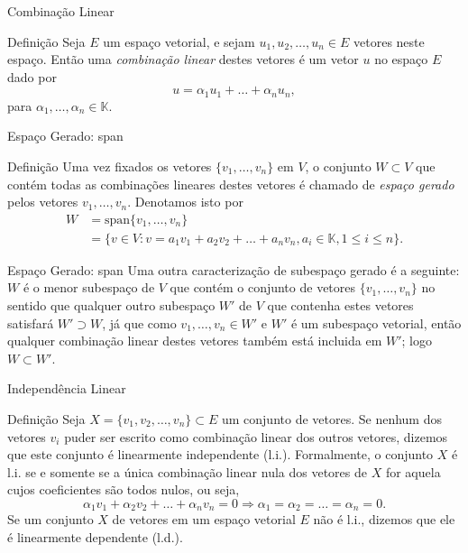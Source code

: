 \documentclass{beamer}
\begin{document}
\begin{darkframes}
\begin{frame}{Combinação Linear}
    \begin{block}{Definição}
      Seja $E$ um espaço vetorial, e sejam $u_1,u_2,\ldots,u_n \in E$ vetores neste espaço. Então uma \emph{combinação linear} destes vetores é um vetor $u$ no espaço $E$ dado por
      \begin{equation*}
        u = \alpha_1 u_1+\ldots+\alpha_n u_n,
      \end{equation*}
      para $\alpha_1,\ldots,\alpha_n \in {\mathbb{K}}$.
    \end{block}
  \end{frame}
  
  \begin{frame}{Espaço Gerado: span}
    \begin{block}{Definição}
      Uma vez fixados os vetores $\{ v_1,\ldots,v_n\}$ em $V$, o conjunto $W\subset V$ que contém todas as combinações lineares destes vetores é chamado de \emph{espaço gerado} pelos vetores $v_1,\ldots,v_n$. Denotamos isto por
      \begin{align*}
        W &= \text{span}\{v_1,\ldots,v_n\}\\
          &= \{ v \in V : v = a_1v_1 + a_2v_2 + \ldots + a_n v_n, a_i\in {\mathbb{K}}, 1\leq i \leq n\}.
      \end{align*}
    \end{block}
  \end{frame}
  
  \begin{frame}{Espaço Gerado: span}
    Uma outra caracterização de subespaço gerado é a seguinte:
    \vfill
    \alert{$W$ é o menor subespaço de $V$ que contém o conjunto de vetores $\{ v_1,\ldots,v_n\}$} no sentido que qualquer outro subespaço $W'$ de $V$ que contenha estes vetores satisfará $W' \supset W$, já que como $v_1,\ldots,v_n \in W'$ e $W'$ é um subespaço vetorial, então qualquer combinação linear destes vetores também está incluida em $W'$; logo $W\subset W'$.
  \end{frame}
  
  \begin{frame}{Independência Linear}
    \begin{block}{Definição}
      Seja $X=\{v_1,v_2,\ldots,v_n\}\subset E$ um conjunto de vetores. Se nenhum dos vetores $v_i$ puder ser escrito como combinação linear dos outros vetores, dizemos que este conjunto é linearmente independente (l.i.). Formalmente, o conjunto $X$ é l.i. se e somente se a única combinação linear nula dos vetores de $X$ for aquela cujos coeficientes são todos nulos, ou seja,
      \begin{equation*}
        \alpha_1v_1+\alpha_2 v_2 + \ldots + \alpha_n v_n = 0 \Rightarrow \alpha_1=\alpha_2=\ldots=\alpha_n=0.
      \end{equation*}
      Se um conjunto $X$ de vetores em um espaço vetorial $E$ não é l.i., dizemos que ele é linearmente dependente (l.d.).
    \end{block}
  \end{frame}
  

\end{darkframes}
\end{document}
